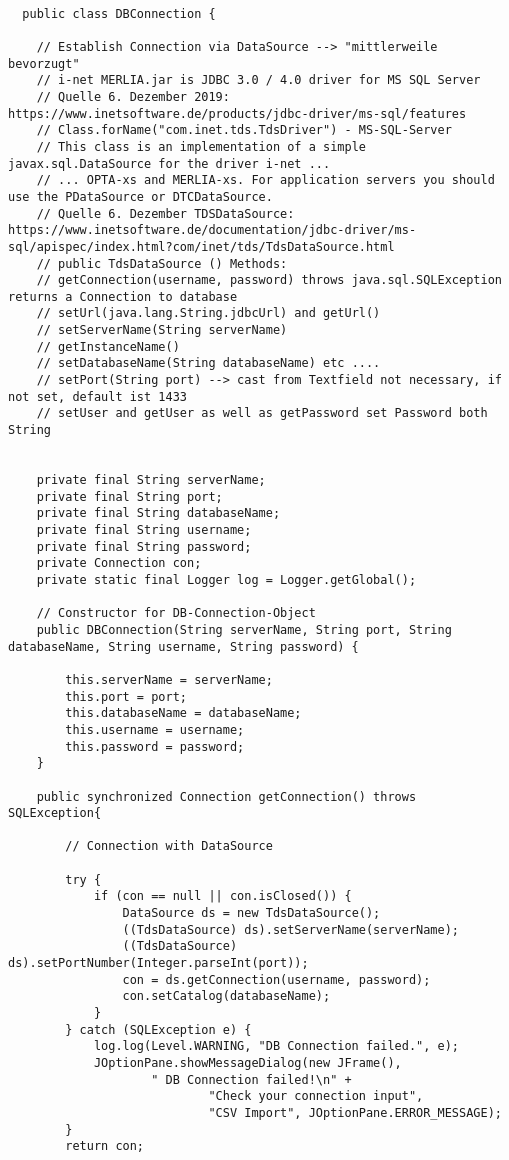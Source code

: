 \begin{lstlisting}

  public class DBConnection {

	// Establish Connection via DataSource --> "mittlerweile bevorzugt"
	// i-net MERLIA.jar is JDBC 3.0 / 4.0 driver for MS SQL Server
	// Quelle 6. Dezember 2019: https://www.inetsoftware.de/products/jdbc-driver/ms-sql/features
	// Class.forName("com.inet.tds.TdsDriver") - MS-SQL-Server
	// This class is an implementation of a simple javax.sql.DataSource for the driver i-net ...
	// ... OPTA-xs and MERLIA-xs. For application servers you should use the PDataSource or DTCDataSource.
	// Quelle 6. Dezember TDSDataSource: https://www.inetsoftware.de/documentation/jdbc-driver/ms-sql/apispec/index.html?com/inet/tds/TdsDataSource.html
	// public TdsDataSource () Methods:
	// getConnection(username, password) throws java.sql.SQLException returns a Connection to database
	// setUrl(java.lang.String.jdbcUrl) and getUrl()
	// setServerName(String serverName)
	// getInstanceName()
	// setDatabaseName(String databaseName) etc ....
	// setPort(String port) --> cast from Textfield not necessary, if not set, default ist 1433
	// setUser and getUser as well as getPassword set Password both String


	private final String serverName;
	private final String port;
	private final String databaseName;
	private final String username;
	private final String password;
	private Connection con;
	private static final Logger log = Logger.getGlobal();

	// Constructor for DB-Connection-Object
	public DBConnection(String serverName, String port, String databaseName, String username, String password) {

		this.serverName = serverName;
		this.port = port;
		this.databaseName = databaseName;
		this.username = username;
		this.password = password;
	}

	public synchronized Connection getConnection() throws SQLException{

		// Connection with DataSource

		try {
			if (con == null || con.isClosed()) {
				DataSource ds = new TdsDataSource();
				((TdsDataSource) ds).setServerName(serverName);
				((TdsDataSource) ds).setPortNumber(Integer.parseInt(port));
				con = ds.getConnection(username, password);
				con.setCatalog(databaseName);
			}
		} catch (SQLException e) {
			log.log(Level.WARNING, "DB Connection failed.", e);
			JOptionPane.showMessageDialog(new JFrame(),
					" DB Connection failed!\n" +
							"Check your connection input",
							"CSV Import", JOptionPane.ERROR_MESSAGE);
		}
		return con;


\end{lstlisting}
